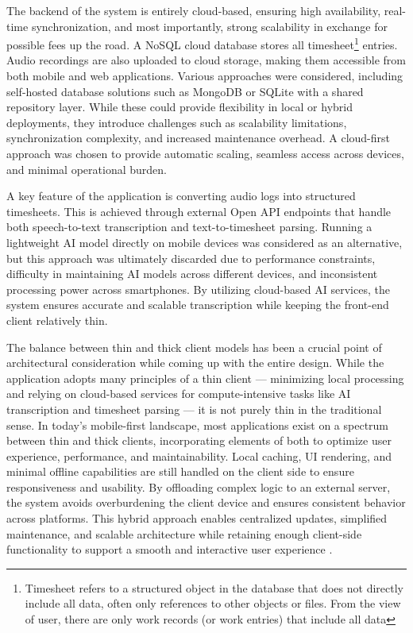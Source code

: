 \documentclass[
  digital,     %
  oneside,     %
  nosansbold,  %
  nocolorbold, %
  lof,         %
  lot,         %
]{fithesis4}
\begin{document}
The backend of the system is entirely cloud-based, ensuring high availability, real-time synchronization, and most importantly, strong scalability in exchange for possible fees up the road. A \gls{NoSQL} cloud database stores all timesheet\footnote{Timesheet refers to a structured object in the database that does not directly include all data, often only references to other objects or files. From the view of user, there are only work records (or work entries) that include all data} entries. Audio recordings are also uploaded to cloud storage, making them accessible from both mobile and web applications. Various approaches were considered, including self-hosted database solutions such as MongoDB or SQLite with a shared repository layer. While these could provide flexibility in local or hybrid deployments, they introduce challenges such as scalability limitations, synchronization complexity, and increased maintenance overhead. A cloud-first approach was chosen to provide automatic scaling, seamless access across devices, and minimal operational burden.

A key feature of the application is converting audio logs into structured timesheets. This is achieved through external Open \gls{API} endpoints that handle both speech-to-text transcription and text-to-timesheet parsing. Running a lightweight \gls{AI} model directly on mobile devices was considered as an alternative, but this approach was ultimately discarded due to performance constraints, difficulty in maintaining \gls{AI} models across different devices, and inconsistent processing power across smartphones. By utilizing cloud-based \gls{AI} services, the system ensures accurate and scalable transcription while keeping the front-end client relatively thin.

The balance between thin and thick client models has been a crucial point of architectural consideration while coming up with the entire design. While the application adopts many principles of a thin client — minimizing local processing and relying on cloud-based services for compute-intensive tasks like \gls{AI} transcription and timesheet parsing — it is not purely thin in the traditional sense. In today’s mobile-first landscape, most applications exist on a spectrum between thin and thick clients, incorporating elements of both to optimize user experience, performance, and maintainability. Local caching, \gls{UI} rendering, and minimal offline capabilities are still handled on the client side to ensure responsiveness and usability. By offloading complex logic to an external server, the system avoids overburdening the client device and ensures consistent behavior across platforms. This hybrid approach enables centralized updates, simplified maintenance, and scalable architecture while retaining enough client-side functionality to support a smooth and interactive user experience \cite{distributedSystems}.
\end{document}
